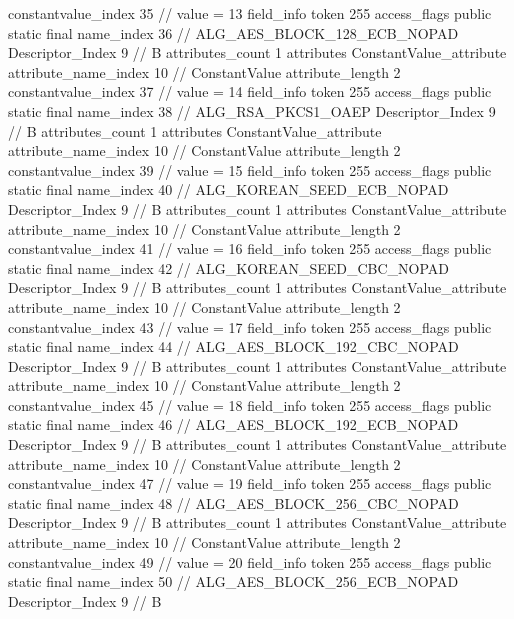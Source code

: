 {{{{{{{					constantvalue_index	35		// value = 13
				}
				}
			}
			field_info {
				token	255
				access_flags	public static final
				name_index	36		// ALG_AES_BLOCK_128_ECB_NOPAD
				Descriptor_Index	9		// B
				attributes_count	1
				attributes {
				ConstantValue_attribute {
					attribute_name_index	10		// ConstantValue
					attribute_length	2
					constantvalue_index	37		// value = 14
				}
				}
			}
			field_info {
				token	255
				access_flags	public static final
				name_index	38		// ALG_RSA_PKCS1_OAEP
				Descriptor_Index	9		// B
				attributes_count	1
				attributes {
				ConstantValue_attribute {
					attribute_name_index	10		// ConstantValue
					attribute_length	2
					constantvalue_index	39		// value = 15
				}
				}
			}
			field_info {
				token	255
				access_flags	public static final
				name_index	40		// ALG_KOREAN_SEED_ECB_NOPAD
				Descriptor_Index	9		// B
				attributes_count	1
				attributes {
				ConstantValue_attribute {
					attribute_name_index	10		// ConstantValue
					attribute_length	2
					constantvalue_index	41		// value = 16
				}
				}
			}
			field_info {
				token	255
				access_flags	public static final
				name_index	42		// ALG_KOREAN_SEED_CBC_NOPAD
				Descriptor_Index	9		// B
				attributes_count	1
				attributes {
				ConstantValue_attribute {
					attribute_name_index	10		// ConstantValue
					attribute_length	2
					constantvalue_index	43		// value = 17
				}
				}
			}
			field_info {
				token	255
				access_flags	public static final
				name_index	44		// ALG_AES_BLOCK_192_CBC_NOPAD
				Descriptor_Index	9		// B
				attributes_count	1
				attributes {
				ConstantValue_attribute {
					attribute_name_index	10		// ConstantValue
					attribute_length	2
					constantvalue_index	45		// value = 18
				}
				}
			}
			field_info {
				token	255
				access_flags	public static final
				name_index	46		// ALG_AES_BLOCK_192_ECB_NOPAD
				Descriptor_Index	9		// B
				attributes_count	1
				attributes {
				ConstantValue_attribute {
					attribute_name_index	10		// ConstantValue
					attribute_length	2
					constantvalue_index	47		// value = 19
				}
				}
			}
			field_info {
				token	255
				access_flags	public static final
				name_index	48		// ALG_AES_BLOCK_256_CBC_NOPAD
				Descriptor_Index	9		// B
				attributes_count	1
				attributes {
				ConstantValue_attribute {
					attribute_name_index	10		// ConstantValue
					attribute_length	2
					constantvalue_index	49		// value = 20
				}
				}
			}
			field_info {
				token	255
				access_flags	public static final
				name_index	50		// ALG_AES_BLOCK_256_ECB_NOPAD
				Descriptor_Index	9		// B
}}}}}
